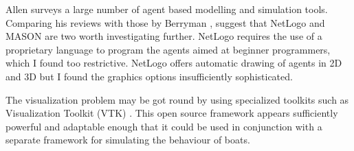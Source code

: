 Allen \cite{Allan2009} surveys a large number of agent based
modelling and simulation tools. Comparing his reviews with those by
Berryman \cite{Berryman2008}, suggest that NetLogo and MASON are two
worth investigating further. NetLogo requires the use of a proprietary
language to program the agents aimed at beginner programmers, which I
found too restrictive. NetLogo offers automatic drawing of agents in
2D and 3D but I found the graphics options insufficiently
sophisticated.

The visualization problem may be got round by using specialized
toolkits such as Visualization Toolkit (VTK) \cite{kitware}. This open source framework
appears sufficiently powerful and adaptable enough that it could be
used in conjunction with a separate framework for simulating the
behaviour of boats.
